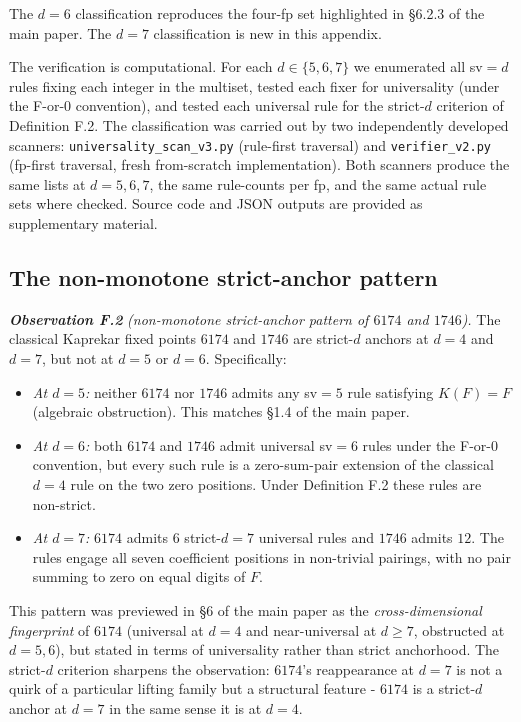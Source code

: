 \documentclass[11pt,letterpaper]{article}
\providecommand{\tightlist}{%
  \setlength{\itemsep}{0pt}\setlength{\parskip}{0pt}}
\theoremstyle{paperstyle}
\theoremstyle{paperstyledef}
\theoremstyle{paperstylerem}
\begin{document}
The \(d = 6\) classification reproduces the four-fp set highlighted in
§6.2.3 of the main paper. The \(d = 7\) classification is new in this
appendix.

The verification is computational. For each \(d \in \{5, 6, 7\}\) we
enumerated all sv\(=d\) rules fixing each integer in the multiset,
tested each fixer for universality (under the F-or-0 convention), and
tested each universal rule for the strict-\(d\) criterion of Definition
F.2. The classification was carried out by two independently developed
scanners: \texttt{universality\_scan\_v3.py} (rule-first traversal) and
\texttt{verifier\_v2.py} (fp-first traversal, fresh from-scratch
implementation). Both scanners produce the same lists at
\(d = 5, 6, 7\), the same rule-counts per fp, and the same actual rule
sets where checked. Source code and JSON outputs are provided as
supplementary material.

\hypertarget{f.4-the-non-monotone-strict-anchor-pattern}{%
\subsection{The non-monotone strict-anchor pattern}\label{f.4-the-non-monotone-strict-anchor-pattern}}

\textbf{\emph{Observation F.2}} \emph{(non-monotone strict-anchor
pattern of \(6174\) and \(1746\)).} The classical Kaprekar fixed points
\(6174\) and \(1746\) are strict-\(d\) anchors at \(d = 4\) and
\(d = 7\), but not at \(d = 5\) or \(d = 6\). Specifically:

\begin{itemize}
\tightlist
\item
  \emph{At \(d = 5\):} neither \(6174\) nor \(1746\) admits any sv\(=5\)
  rule satisfying \(K(F) = F\) (algebraic obstruction). This matches
  §1.4 of the main paper.
\item
  \emph{At \(d = 6\):} both \(6174\) and \(1746\) admit universal
  sv\(=6\) rules under the F-or-0 convention, but every such rule is a
  zero-sum-pair extension of the classical \(d = 4\) rule on the two
  zero positions. Under Definition F.2 these rules are non-strict.
\item
  \emph{At \(d = 7\):} \(6174\) admits \(6\) strict-\(d = 7\) universal
  rules and \(1746\) admits \(12\). The rules engage all seven
  coefficient positions in non-trivial pairings, with no pair summing to
  zero on equal digits of \(F\).
\end{itemize}

This pattern was previewed in §6 of the main paper as the
\emph{cross-dimensional fingerprint} of \(6174\) (universal at \(d = 4\)
and near-universal at \(d \geq 7\), obstructed at \(d = 5, 6\)), but
stated in terms of universality rather than strict anchorhood. The
strict-\(d\) criterion sharpens the observation: \(6174\)'s reappearance
at \(d = 7\) is not a quirk of a particular lifting family but a
structural feature - \(6174\) is a strict-\(d\) anchor at \(d = 7\) in
the same sense it is at \(d = 4\).
\end{document}
